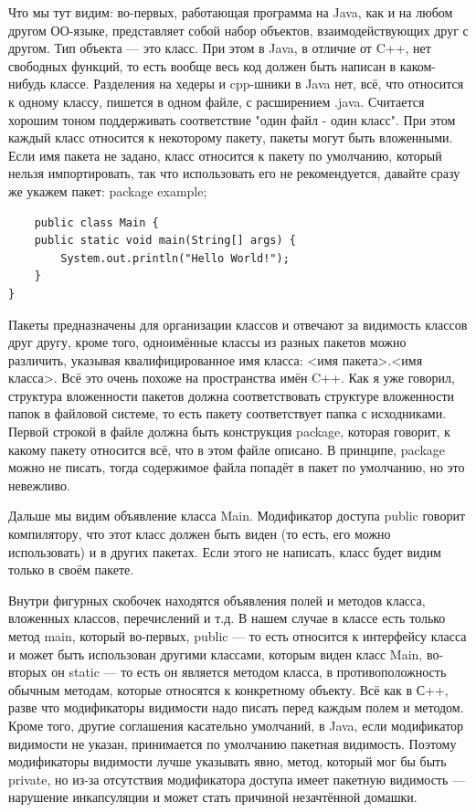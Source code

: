 \documentclass[a5paper]{article}
\begin{document}
Что мы тут видим: во-первых, работающая программа на Java, как и на любом другом ОО-языке, представляет собой набор объектов, взаимодействующих друг с другом. Тип объекта --- это класс. При этом в Java, в отличие от C++, нет свободных функций, то есть вообще весь код должен быть написан в каком-нибудь классе. Разделения на хедеры и cpp-шники в Java нет, всё, что относится к одному классу, пишется в одном файле, с расширением .java. Считается хорошим тоном поддерживать соответствие "один файл - один класс". При этом каждый класс относится к некоторому пакету, пакеты могут быть вложенными. Если имя пакета не задано, класс относится к пакету по умолчанию, который нельзя импортировать, так что использовать его не рекомендуется, давайте сразу же укажем пакет:
package example;

\begin{verbatim}
    public class Main {
    public static void main(String[] args) {
        System.out.println("Hello World!");
    }
}
\end{verbatim}

Пакеты предназначены для организации классов и отвечают за видимость классов друг другу, кроме того, одноимённые классы из разных пакетов можно различить, указывая квалифицированное имя класса: <имя пакета>.<имя класса>. Всё это очень похоже на пространства имён C++. Как я уже говорил, структура вложенности пакетов должна соответствовать структуре вложенности папок в файловой системе, то есть пакету соответствует папка с исходниками. Первой строкой в файле должна быть конструкция package, которая говорит, к какому пакету относится всё, что в этом файле описано. В принципе, package можно не писать, тогда содержимое файла попадёт в пакет по умолчанию, но это невежливо.

Дальше мы видим объявление класса Main. Модификатор доступа public говорит компилятору, что этот класс должен быть виден (то есть, его можно использовать) и в других пакетах. Если этого не написать, класс будет видим только в своём пакете.

Внутри фигурных скобочек находятся объявления полей и методов класса, вложенных классов, перечислений  и т.д. В нашем случае в классе есть только метод main, который во-первых, public --- то есть относится к интерфейсу класса и может быть использован другими классами, которым виден класс Main, во-вторых он static --- то есть он является методом класса, в противоположность обычным методам, которые относятся к конкретному объекту. Всё как в  С++, разве что модификаторы видимости надо писать перед каждым полем и методом. Кроме того, другие соглашения касательно умолчаний, в Java, если модификатор видимости не указан, принимается по умолчанию пакетная видимость. Поэтому модификаторы видимости лучше указывать явно, метод, который мог бы быть private, но из-за отсутствия модификатора доступа имеет пакетную видимость --- нарушение инкапсуляции и может стать причиной незачтённой домашки.
\end{document}
